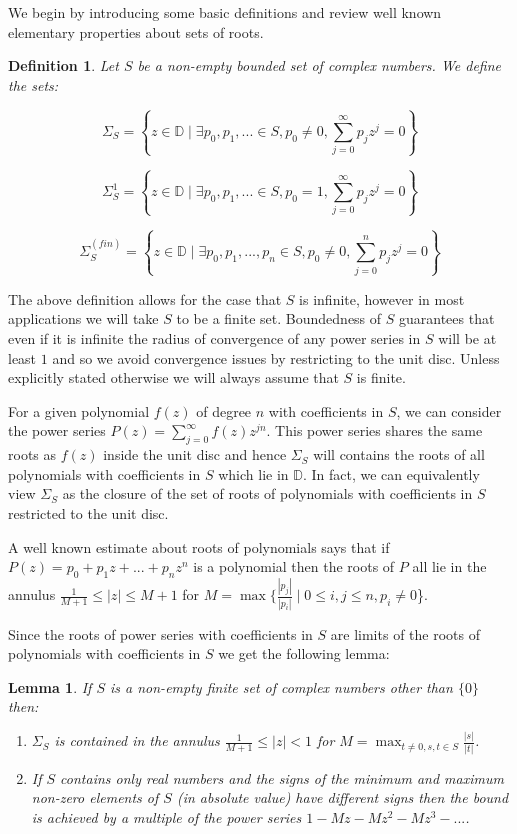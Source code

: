\documentclass[11pt]{amsart}
\newtheorem{lemma}[theorem]{Lemma}
\newtheorem{definition}[theorem]{Definition}
\numberwithin{theorem}{section} %
\numberwithin{corollary}{section}
\numberwithin{lemma}{section}
\numberwithin{proposition}{section}
\numberwithin{definition}{section}
\begin{document}
We begin by introducing some basic definitions and review well known elementary properties about sets of roots.

\begin{definition}
Let $S$ be a non-empty bounded set of complex numbers. We define the sets:

\[
\Sigma_S = \left \{ z \in \mathbb{D} \mid \exists p_0, p_1, ... \in S, p_0 \neq 0, \sum_{j=0}^\infty p_jz^j = 0 \right \} 
\]

\[
\Sigma_S^1 = \left \{ z \in \mathbb{D} \mid \exists p_0, p_1, ... \in S, p_0 = 1, \sum_{j=0}^\infty p_jz^j = 0 \right \} 
\]

\[
\Sigma_S^{(fin)} = \left \{ z \in \mathbb{D} \mid \exists p_0, p_1, ..., p_n \in S, p_0 \neq 0, \sum_{j=0}^n p_jz^j = 0 \right \}
\]

\end{definition}





The above definition allows for the case that $S$ is infinite, however in most applications we will take $S$ to be a finite set. Boundedness of $S$ guarantees that even if it is infinite the radius of convergence of any power series in $S$ will be at least $1$ and so we avoid convergence issues by restricting to the unit disc. Unless explicitly stated otherwise we will always assume that $S$ is finite.

For a given polynomial $f(z)$ of degree $n$ with coefficients in $S$, we can consider the power series $P(z) = \sum_{j=0}^\infty f(z)z^{jn}$. This power series shares the same roots as $f(z)$ inside the unit disc and hence $\Sigma_S$ will contains the roots of all polynomials with coefficients in $S$ which lie in $\mathbb{D}$. In fact, we can equivalently view $\Sigma_S$ as the closure of the set of roots of polynomials with coefficients in $S$ restricted to the unit disc.

A well known estimate about roots of polynomials says that if $P(z) = p_0 + p_1z + ... + p_nz^n$ is a polynomial then the roots of $P$ all lie in the annulus $\frac{1}{M+1} \leq |z| \leq M+1$ for $M = \max \{\frac{|p_j|}{|p_i|} \mid 0 \leqslant i, j \leqslant n, p_i \neq 0$\}. 

Since the roots of power series with coefficients in $S$ are limits of the roots of polynomials with coefficients in $S$ we get the following lemma:

\begin{lemma}
	\label{outerannulus}
	 If $S$ is a non-empty finite set of complex numbers other than $\{ 0 \}$ then:
	\begin{enumerate}
		\item $\Sigma_S$ is contained in the annulus $\frac{1}{M+1} \leq |z| < 1$ for $M = \max_{t \neq 0, s, t \in S} \frac{|s|}{|t|}$. 

		\item If $S$ contains only real numbers and the signs of the minimum and maximum non-zero elements of $S$ (in absolute value) have different signs then the bound is achieved by a multiple of the power series $1 - Mz - Mz^2 - Mz^3 - ...$.
	\end{enumerate}
\end{lemma}
\end{document}
